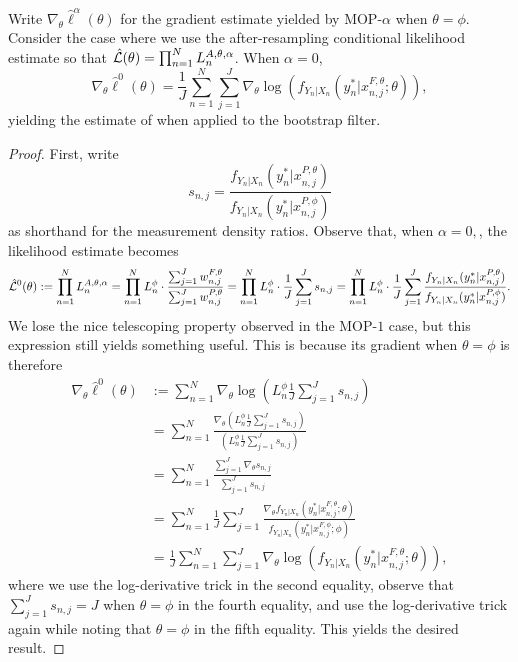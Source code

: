 \begin{lem}
\label{lem:mop-0-formula}

 Write $\nabla_\theta \hat\ell^\alpha(\theta)$ for the gradient estimate yielded by MOP-$\alpha$ when $\theta=\phi$. Consider the case where we use the after-resampling conditional likelihood estimate so that $\hat{\mathcal{L}}(\theta) = \prod_{n=1}^N L_n^{A, \theta, \alpha}$. When $\alpha=0$,
    \begin{equation}
        \nabla_\theta \hat\ell^0(\theta) 
        = \frac{1}{J} \sum_{n=1}^N \sum_{j=1}^J \nabla_\theta \log\left(f_{Y_n|X_{n}}(y_n^*|x_{n,j}^{F, \theta}; \theta)\right),
    \end{equation}
    yielding the estimate of \cite{naesseth18} when applied to the bootstrap filter. 
\end{lem}

\begin{proof}
First, write $$s_{n,j} = \frac{f_{Y_n|X_n}(y_n^*|x_{n,j}^{P, \theta})}{f_{Y_n|X_n}(y_n^*|x_{n,j}^{P, \phi})}$$
as shorthand for the measurement density ratios. 
Observe that, when $\alpha=0,$, the likelihood estimate becomes
\begin{equation}
\nonumber
    \hat{\mathcal{L}}^0(\theta) := \prod_{n=1}^N L_n^{A, \theta, \alpha} = \prod_{n=1}^N L_n^\phi \cdot \frac{\sum_{j=1}^J w_{n,j}^{F,\theta}}{\sum_{j=1}^J w_{n,j}^{P,\theta}} = \prod_{n=1}^N L_n^\phi \cdot \frac{1}{J}\sum_{j=1}^J s_{n,j} = \prod_{n=1}^N L_n^\phi \cdot \frac{1}{J}\sum_{j=1}^J \frac{f_{Y_n|X_n}(y_n^*|x_{n,j}^{P, \theta})}{f_{Y_n|X_n}(y_n^*|x_{n,j}^{P, \phi})}.
\end{equation}
We lose the nice telescoping property observed in the MOP-$1$ case, but this expression still yields something useful. 
This is because its gradient when $\theta=\phi$ is therefore 
\begin{align*}
    \nabla_\theta \hat{\ell}^0(\theta) &:= \sum_{n=1}^N \nabla_\theta \log\left(L_n^\phi \frac{1}{J} \sum_{j=1}^J s_{n,j}\right) \\
    &= \sum_{n=1}^N \frac{\nabla_\theta \left(L_n^\phi \frac{1}{J} \sum_{j=1}^J s_{n,j}\right)}{\left(L_n^\phi \frac{1}{J} \sum_{j=1}^J s_{n,j}\right)} \\
    &= \sum_{n=1}^N \frac{\sum_{j=1}^J \nabla_\theta s_{n,j}}{\sum_{j=1}^J s_{n,j}} \\
    &= \sum_{n=1}^N \frac{1}{J} \sum_{j=1}^J \frac{\nabla_\theta f_{Y_n|X_{n}}(y_n^*|x_{n,j}^{F, \theta}; \theta)}{f_{Y_n|X_{n}}(y_n^*|x_{n,j}^{F, \phi}; \phi)} \\
    &= \frac{1}{J} \sum_{n=1}^N \sum_{j=1}^J \nabla_\theta \log\left(f_{Y_n|X_{n}}(y_n^*|x_{n,j}^{F, \theta}; \theta)\right),
\end{align*}
where we use the log-derivative trick in the second equality, observe that $\sum_{j=1}^J s_{n,j} = J$ when $\theta=\phi$ in the fourth equality, and use the log-derivative trick again while noting that $\theta=\phi$ in the fifth equality. This yields the desired result.
\end{proof}



